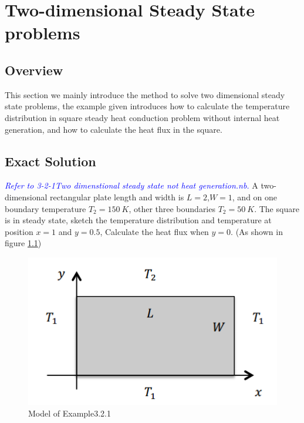 \chapter{Two-dimensional Steady State problems}
\section{Overview}
This section we mainly introduce the method to solve two dimensional steady state problems, the example given introduces how to calculate the temperature distribution in square steady heat conduction problem without internal heat generation, and how to calculate the heat flux in the square.
\section{Exact Solution}
\begin{example}
\textcolor{blue} {\emph{Refer to 3-2-1Two dimenstional steady state not heat generation.nb.}}
A two-dimensional rectangular plate length and width is $L=2$,$W=1$, and on one 
boundary temperature $T_2=150~K$, other three boundaries $T_2=50~K$. The square 
is in steady state, sketch the temperature distribution and temperature at position $x=1$ and $y=0.5$,
Calculate the heat flux when $y=0$. (As shown in figure \ref{fig:3:1})
\begin{figure}[h!]
  \centering
    \includegraphics[scale=0.8]{figures/ch3/1}
    \caption{Model of Example3.2.1}
    \label{fig:3:1}
\end{figure}
\end{example}

